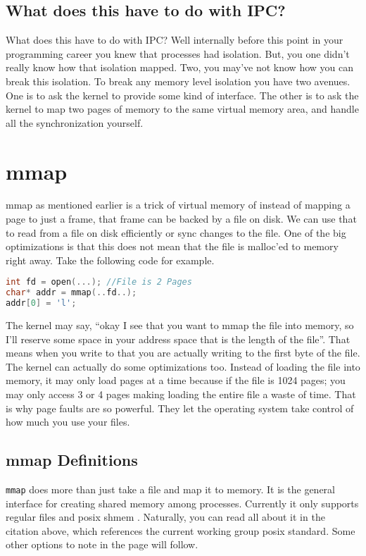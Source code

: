 \subsection{What does this have to do with IPC?}

What does this have to do with IPC?
Well internally before this point in your programming career you knew that processes had isolation.
But, you one didn't really know how that isolation mapped.
Two, you may've not know how you can break this isolation.
To break any memory level isolation you have two avenues.
One is to ask the kernel to provide some kind of interface.
The other is to ask the kernel to map two pages of memory to the same virtual memory area, and handle all the synchronization yourself.

\section{mmap}

mmap as mentioned earlier is a trick of virtual memory of instead of mapping a page to just a frame, that frame can be backed by a file on disk.
We can use that to read from a file on disk efficiently or sync changes to the file.
One of the big optimizations is that this does not mean that the file is malloc'ed to memory right away. Take the following code for example.

\begin{lstlisting}[language=C]
int fd = open(...); //File is 2 Pages
char* addr = mmap(..fd..);
addr[0] = 'l';
\end{lstlisting}

The kernel may say, ``okay I see that you want to mmap the file into memory, so I'll reserve some space in your address space that is the length of the file''.
That means when you write to  that you are actually writing to the first byte of the file.
The kernel can actually do some optimizations too.
Instead of loading the file into memory, it may only load pages at a time because if the file is 1024 pages; you may only access 3 or 4 pages making loading the entire file a waste of time.
That is why page faults are so powerful.
They let the operating system take control of how much you use your files.

\subsection{mmap Definitions}

\texttt{mmap} does more than just take a file and map it to memory.
It is the general interface for creating shared memory among processes.
Currently it only supports regular files and posix shmem \cite{mmap_2018}.
Naturally, you can read all about it in the citation above, which references the current working group posix standard.
Some other options to note in the page will follow.

